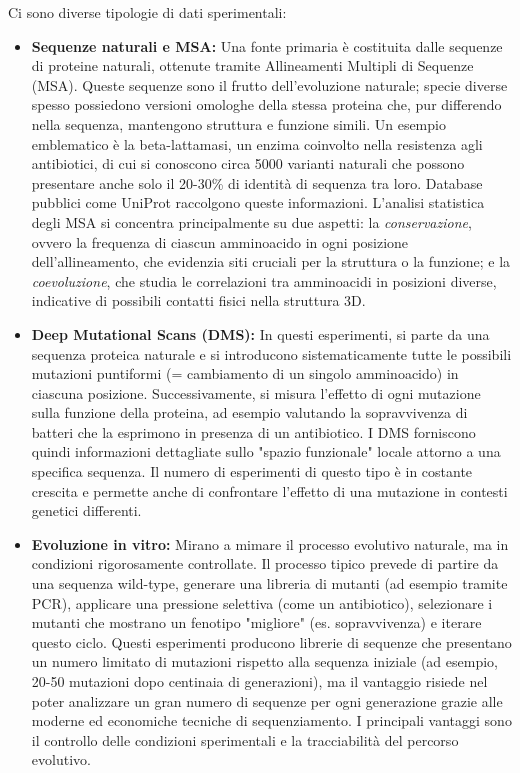 Ci sono diverse tipologie di dati sperimentali:

\begin{itemize}
    \item \textbf{Sequenze naturali e MSA:} Una fonte primaria è costituita dalle sequenze di proteine naturali, ottenute tramite Allineamenti Multipli di Sequenze (MSA). Queste sequenze sono il frutto dell'evoluzione naturale; specie diverse spesso possiedono versioni omologhe della stessa proteina che, pur differendo nella sequenza, mantengono struttura e funzione simili. Un esempio emblematico è la beta-lattamasi, un enzima coinvolto nella resistenza agli antibiotici, di cui si conoscono circa 5000 varianti naturali che possono presentare anche solo il 20-30\% di identità di sequenza tra loro. Database pubblici come UniProt raccolgono queste informazioni. L'analisi statistica degli MSA si concentra principalmente su due aspetti: la \textit{conservazione}, ovvero la frequenza di ciascun amminoacido in ogni posizione dell'allineamento, che evidenzia siti cruciali per la struttura o la funzione; e la \textit{coevoluzione}, che studia le correlazioni tra amminoacidi in posizioni diverse, indicative di possibili contatti fisici nella struttura 3D.
    \item \textbf{Deep Mutational Scans (DMS):} In questi esperimenti, si parte da una sequenza proteica naturale e si introducono sistematicamente tutte le possibili mutazioni puntiformi (= cambiamento di un singolo amminoacido) in ciascuna posizione. Successivamente, si misura l'effetto di ogni mutazione sulla funzione della proteina, ad esempio valutando la sopravvivenza di batteri che la esprimono in presenza di un antibiotico. I DMS forniscono quindi informazioni dettagliate sullo "spazio funzionale" locale attorno a una specifica sequenza. Il numero di esperimenti di questo tipo è in costante crescita e permette anche di confrontare l'effetto di una mutazione in contesti genetici differenti.
    \item \textbf{Evoluzione in vitro:} Mirano a mimare il processo evolutivo naturale, ma in condizioni rigorosamente controllate. Il processo tipico prevede di partire da una sequenza wild-type, generare una libreria di mutanti (ad esempio tramite PCR), applicare una pressione selettiva (come un antibiotico), selezionare i mutanti che mostrano un fenotipo "migliore" (es. sopravvivenza) e iterare questo ciclo. Questi esperimenti producono librerie di sequenze che presentano un numero limitato di mutazioni rispetto alla sequenza iniziale (ad esempio, 20-50 mutazioni dopo centinaia di generazioni), ma il vantaggio risiede nel poter analizzare un gran numero di sequenze per ogni generazione grazie alle moderne ed economiche tecniche di sequenziamento. I principali vantaggi sono il controllo delle condizioni sperimentali e la tracciabilità del percorso evolutivo.

\end{itemize}
